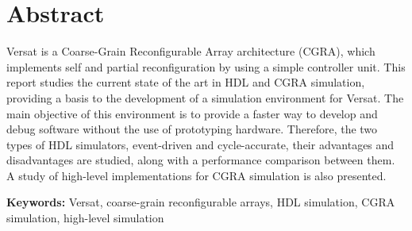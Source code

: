 
\section*{Abstract}


Versat is a Coarse-Grain Reconfigurable Array architecture (CGRA), which
implements self and partial reconfiguration by using a simple controller
unit. This report studies the current state of the art in HDL and CGRA
simulation, providing a basis to the development of a simulation environment for
Versat. The main objective of this environment is to provide a faster way to
develop and debug software without the use of prototyping hardware. Therefore,
the two types of HDL simulators, event-driven and cycle-accurate, their
advantages and disadvantages are studied, along with a performance comparison
between them. A study of high-level implementations for CGRA simulation is
also presented.

\vfill

\textbf{\Large Keywords:} Versat, coarse-grain reconfigurable arrays, HDL
simulation, CGRA simulation, high-level simulation


